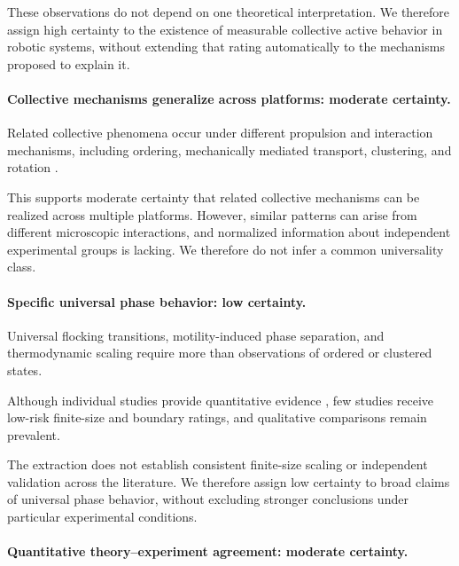These observations do not depend on one
theoretical interpretation. We therefore
assign high certainty to the existence
of measurable collective active behavior
in robotic systems, without extending
that rating automatically to the
mechanisms proposed to explain it.

\paragraph*{Collective mechanisms generalize across platforms:
moderate certainty.}

Related collective phenomena occur under
different propulsion and interaction
mechanisms, including ordering,
mechanically mediated transport,
clustering, and rotation
\cite{Tarcai2011patternstransition,Scholz2018rotatingrobotsmove,Buerle2020formationofstable,Chvykov2020lowrattlingapred,Fruchart2022nonreciprocalphase,Chen2024persistentandrespo,Luo2025flockingphasesepar,Casiulis2025ageometricconditio}.

This supports moderate certainty that
related collective mechanisms can be
realized across multiple platforms.
However, similar patterns can arise
from different microscopic interactions,
and normalized information about
independent experimental groups is lacking.
We therefore do not infer a common
universality class.

\paragraph*{Specific universal phase behavior:
low certainty.}

Universal flocking transitions,
motility-induced phase separation,
and thermodynamic scaling require
more than observations of ordered
or clustered states.

Although individual studies provide
quantitative evidence
\cite{Tarcai2011patternstransition,Buerle2020formationofstable,Xiao2023perceptionofmotion,Barone2024experimentalandnum,Wang2025hyperuniformnetwork,Verdoucq2025flockingphasetrans},
few studies receive low-risk
finite-size and boundary ratings,
and qualitative comparisons
remain prevalent.

The extraction does not establish
consistent finite-size scaling
or independent validation across
the literature. We therefore
assign low certainty to broad
claims of universal phase behavior,
without excluding stronger
conclusions under particular
experimental conditions.

\paragraph*{Quantitative theory--experiment agreement:
moderate certainty.}


